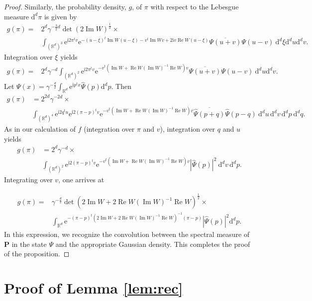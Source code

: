 \documentclass[12pt]{article}
\renewcommand{\Re}{\operatorname{Re}}
\renewcommand{\Im}{\operatorname{Im}}
\renewcommand\i{\mathrm{i}}
\newcommand{\e}{{\mathrm e}}
\renewcommand{\d}{{\mathrm d}}
\begin{document}
\begin{proof}
	Similarly, the probability density, $g$, of $\pi$ with respect to the Lebesgue measure $\d^{d} \pi$ is given by
	\begin{align*}
	g(\pi)=&2^d\gamma^{-\frac32d}\det(2\Im W)^{\frac12}\times\\
	&\int_{(\mathbb R^d)^3}\e^{\i2\pi^tv}\e^{-(u-\xi)^t\Im W(u-\xi) -v^t\Im Wv +2\i v\Re W(u-\xi)}\overline{\Psi(u+v)}\Psi(u-v)\ \d^{d}\xi\d^{d} u \d^{d} v.
	\end{align*}
	Integration over $\xi$ yields
	\begin{align*}
	g(\pi)=&2^d\gamma^{-d}\int_{(\mathbb R^d)^2}\e^{\i2\pi^tv}\e^{-v^t(\Im W +\Re W(\Im W)^{-1}\Re W)v}\overline{\Psi(u+v)}\Psi(u-v)\ \d^{d} u \d^{d} v.
	\end{align*}
	Let $\Psi(x)=\gamma^{-\frac d2}\int_{\mathbb R^d} \e^{\i p^tx} \widehat{\Psi}(p)\d^{d} p$. Then
	\begin{align*}
	g(\pi)& = 2^{2d}\gamma^{-2d}\times\\
	&\int_{(\mathbb R^d)^4}\e^{\i 2q^tu}\e^{\i 2(\pi-p)^tv}\e^{-v^t(\Im W +\Re W(\Im W)^{-1}\Re W)v}\overline{\widehat{\Psi}(p+q)}\widehat{\Psi}(p-q)\ \d^{d} u\, \d^{d} v\, \d^{d} p\ \d^{d} q.
	\end{align*}
	As in our calculation of $f$ (integration over $\pi$ and $v$), integration over $q$ and $u$ yields
	\begin{align*}
	g(\pi)&=2^{d}\gamma^{-d}\times\\
	&\int_{(\mathbb R^d)^2}\e^{\i2(\pi-p)^tv}\e^{-v^t(\Im W +\Re W(\Im W)^{-1}\Re W)v}|\widehat{\Psi}(p)|^2\ \d^{d} v \,\d^{d} p.
	\end{align*}
	Integrating over $v$, one arrives at 

	\begin{align*}
	g(\pi)=&\gamma^{-\frac d2}\det(2\Im W +2\Re W(\Im W)^{-1}\Re W)^{\frac12}\times\\
	&\int_{\mathbb R^d}\e^{-(\pi-p)^t( {2}\Im W+
	{2}\Re W(\Im W)^{-1}\Re W)^{-1}(\pi-p)}|\widehat{\Psi}(p)|^2\d^{d} p.
	\end{align*}
	In this expression, we recognize the convolution between the spectral measure of $\mathbf P$ in the state $\Psi$ and the appropriate Gaussian density. This completes the proof of the proposition.
\end{proof}

\section{Proof of Lemma \ref{lem:rec}}\label{Pf}
\end{document}
